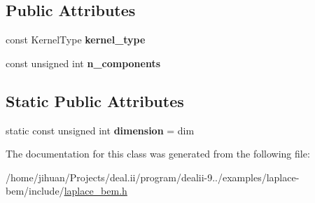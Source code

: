 \subsection*{Public Attributes}
\begin{DoxyCompactItemize}
\item 
\mbox{\label{classLaplaceBEM_1_1LaplaceKernel_1_1KernelFunction_a4e4f538fccd38abfa5619c10cedeae00}} 
const Kernel\+Type {\bfseries kernel\+\_\+type}
\item 
\mbox{\label{classLaplaceBEM_1_1LaplaceKernel_1_1KernelFunction_a21908b76243d0b7b3b61ef67871ed790}} 
const unsigned int {\bfseries n\+\_\+components}
\end{DoxyCompactItemize}
\subsection*{Static Public Attributes}
\begin{DoxyCompactItemize}
\item 
\mbox{\label{classLaplaceBEM_1_1LaplaceKernel_1_1KernelFunction_ad4cf29ad18c345f5d6d781a1b4aad15a}} 
static const unsigned int {\bfseries dimension} = dim
\end{DoxyCompactItemize}


The documentation for this class was generated from the following file\+:\begin{DoxyCompactItemize}
\item 
/home/jihuan/\+Projects/deal.\+ii/program/dealii-\/9../examples/laplace-\/bem/include/\hyperlink{laplace__bem_8h}{laplace\+\_\+bem.\+h}\end{DoxyCompactItemize}
